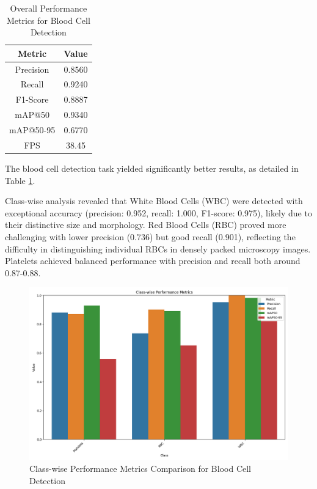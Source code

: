 \begin{table}[ht]
\centering
\begin{tabular}{|c|c|}
\hline
\textbf{Metric} & \textbf{Value} \\
\hline
Precision & 0.8560 \\
Recall & 0.9240 \\
F1-Score & 0.8887 \\
mAP@50 & 0.9340 \\
mAP@50-95 & 0.6770 \\
FPS & 38.45 \\
\hline
\end{tabular}
\caption{Overall Performance Metrics for Blood Cell Detection}
\label{tab:blood_cell_results}
\end{table}

\begin{multicols}{2}
The blood cell detection task yielded significantly better results, as detailed in Table \ref{tab:blood_cell_results}.

Class-wise analysis revealed that White Blood Cells (WBC) were detected with exceptional accuracy (precision: 0.952, recall: 1.000, F1-score: 0.975), likely due to their distinctive size and morphology. Red Blood Cells (RBC) proved more challenging with lower precision (0.736) but good recall (0.901), reflecting the difficulty in distinguishing individual RBCs in densely packed microscopy images. Platelets achieved balanced performance with precision and recall both around 0.87-0.88.
\end{multicols}

\begin{figure}[ht]
\centering
\includegraphics[width=0.9\linewidth]{datas/blood_cell_summary_datas/blood_cells_class_metrics.png}
\caption{Class-wise Performance Metrics Comparison for Blood Cell Detection}
\label{fig:blood_cell_class_metrics}
\end{figure}

